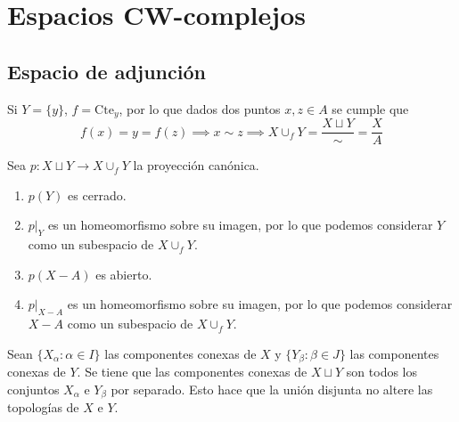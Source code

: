 \chapter{Espacios CW-complejos} \label{CW}
\section{Espacio de adjunción}

Si $Y=\{y\}$, $f=\mbox{Cte}_y$, por lo que dados dos puntos $x,z \in A$ se cumple que $$f(x)=y=f(z) \implies x \sim z \implies X\cup_f Y=\frac{X\sqcup Y}{\sim}=\frac{X}{A}$$

\begin{lema}
Sea $p: X \sqcup Y \longrightarrow X\cup_f Y$ la proyección canónica.
\begin{enumerate}
\item $p(Y)$ es cerrado.
\item $p|_Y$ es un homeomorfismo sobre su imagen, por lo que podemos considerar $Y$ como un subespacio de $X \cup_f Y$.
\item $p(X-A)$ es abierto. 
\item $p|_{X-A}$ es un homeomorfismo sobre su imagen, por lo que podemos considerar $X-A$ como un subespacio de $X \cup_f Y$.
\end{enumerate}
\end{lema}

\begin{nota}
Sean $\{X_\alpha: \alpha \in I\}$ las componentes conexas de $X$ y $\{Y_\beta: \beta \in J\}$ las componentes conexas de $Y$. Se tiene que las componentes conexas de $X\sqcup Y$ son todos los conjuntos $X_\alpha$ e $Y_\beta$ por separado. Esto hace que la unión disjunta no altere las topologías de $X$ e $Y$.
\end{nota}

